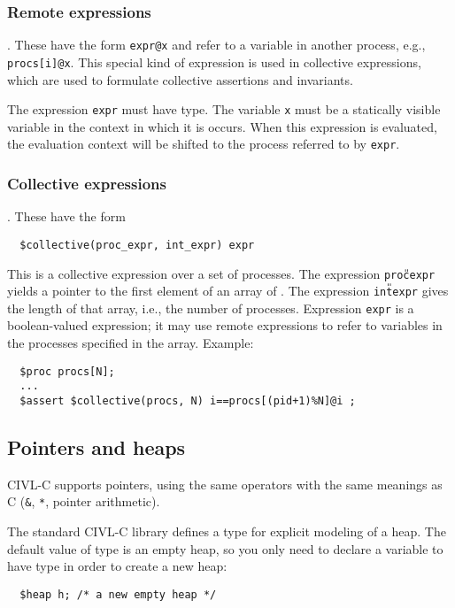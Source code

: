 \documentclass[11pt]{article}
\begin{document}
\subsubsection{Remote expressions}.  These have the form \verb!expr@x!
and refer to a variable in another process, e.g., \verb!procs[i]@x!.
This special kind of expression is used in collective expressions,
which are used to formulate collective assertions and invariants.

The expression \verb!expr! must have \cproc{} type.  The variable
\texttt{x} must be a statically visible variable in the context in
which it is occurs.  When this expression is evaluated, the evaluation
context will be shifted to the process referred to by \texttt{expr}.

\subsubsection{Collective expressions}.  These have the form
\begin{verbatim}
  $collective(proc_expr, int_expr) expr 
\end{verbatim}
This is a collective expression over a set of processes.  The
expression \texttt{proc{\U}expr} yields a pointer to the first element
of an array of \cproc.  The expression \texttt{int{\U}expr} gives the
length of that array, i.e., the number of processes.  Expression
\texttt{expr} is a boolean-valued expression; it may use remote
expressions to refer to variables in the processes specified in the
array.  Example:
\begin{verbatim}
  $proc procs[N];
  ...
  $assert $collective(procs, N) i==procs[(pid+1)%N]@i ;
\end{verbatim}

\subsection{Pointers and heaps}

CIVL-C supports pointers, using the same operators with the same
meanings as C (\texttt{\&}, \texttt{*}, pointer arithmetic).

The standard CIVL-C library defines a type \cheap{} for explicit
modeling of a heap.  The default value of \cheap{} type is an empty
heap, so you only need to declare a variable to have type \cheap{}
in order to create a new heap:
\begin{verbatim}
  $heap h; /* a new empty heap */
\end{verbatim}
\end{document}
